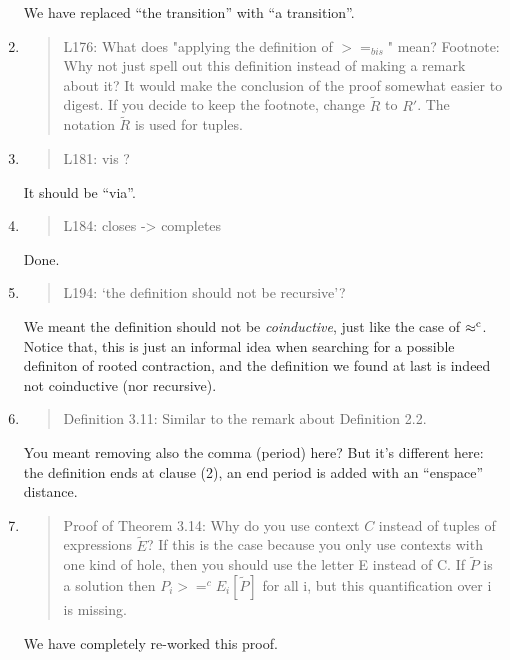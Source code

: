 \begin{enumerate}
  We have replaced ``the transition'' with ``a transition''.

\item \begin{quote}
    L176: What does "applying the definition of $>=_{bis}$" mean?
    Footnote: Why not just spell out this definition instead of making a remark about it?  It would make the conclusion of the proof somewhat easier to digest. If you decide to keep the footnote, change $\tilde{R}$ to $R'$. The notation $\tilde{R}$ is used for tuples.
  \end{quote}

\item \begin{quote}
    L181: vis ?
  \end{quote}

  It should be ``via''.
  
\item \begin{quote}
    L184: closes -> completes
  \end{quote}
  Done.
  
\item \begin{quote}
    L194: ‘the definition should not be recursive’?
  \end{quote}

  We meant the definition should not be \emph{coinductive}, just like the
  case of $\mathrel{\approx^{\rm{c}}}$. Notice that, this is just an informal idea when searching for
  a possible definiton of rooted contraction, and the definition we
  found at last is indeed not coinductive (nor recursive).
  
\item \begin{quote}
    Definition 3.11: Similar to the remark about Definition 2.2.
  \end{quote}
  You meant removing also the comma (period) here? But it's different
  here: the definition ends at clause (2), an end period is added with
  an ``enspace'' distance.
  
\item \begin{quote}
    Proof of Theorem 3.14: Why do you use context $C$ instead of tuples of expressions $\tilde{E}$?
    If this is the case because you only use contexts with one kind of hole, then you should use the letter
    E instead of C.
    If $\tilde{P}$ is a solution then $P_i >=^c E_i[\tilde{P}]$ for all i, but this quantification over i is missing.
  \end{quote}
  We have completely re-worked this proof.


\end{enumerate}
